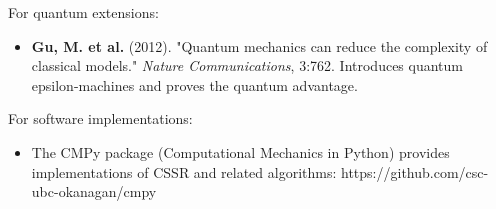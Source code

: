 For quantum extensions:

\begin{itemize}
\item \textbf{Gu, M. et al.} (2012). "Quantum mechanics can reduce the complexity of classical models." \textit{Nature Communications}, 3:762. Introduces quantum epsilon-machines and proves the quantum advantage.
\end{itemize}

For software implementations:

\begin{itemize}
\item The CMPy package (Computational Mechanics in Python) provides implementations of CSSR and related algorithms: https://github.com/csc-ubc-okanagan/cmpy
\end{itemize}

